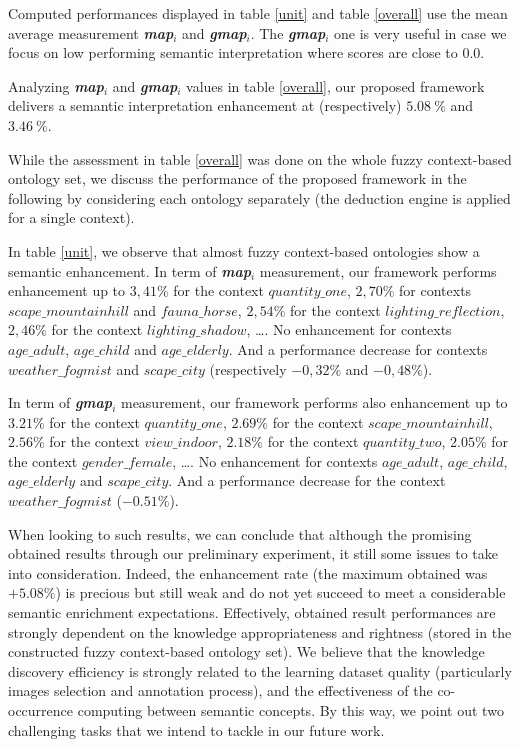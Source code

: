 Computed performances displayed in table \ref{unit} and table \ref{overall} use the mean average measurement \textbf{\textit{map$_{i}$}} and \textbf{\textit{gmap$_{i}$}}.  The \textbf{\textit{gmap$_{i}$}} one is very useful in case we focus on low performing semantic interpretation where scores are close to $0.0$. 

Analyzing \textbf{\textit{map$_{i}$}} and \textbf{\textit{gmap$_{i}$}} values in table \ref{overall}, our proposed framework delivers a semantic interpretation enhancement at (respectively) $5.08~\%$ and $3.46~\%$.

While the assessment in table \ref{overall} was done on the whole fuzzy context-based ontology set, we discuss the performance of the proposed framework in the following by considering each ontology separately (the deduction engine is applied for a single context).

In table \ref{unit}, we observe that almost fuzzy context-based ontologies show a semantic enhancement. In term of \textbf{\textit{map$_{i}$}} measurement, our framework performs enhancement up to $3,41\%$ for the context $quantity\_one$, $2,70\%$ for contexts $scape\_mountainhill$ and $fauna\_horse$, $2,54 \%$ for the context $lighting\_reflection$, $2,46 \%$ for the context $lighting\_shadow$, \dots. No enhancement for  contexts $age\_adult$, $age\_child$ and $age\_elderly$. And a performance decrease for contexts  $weather\_fogmist$ and $scape\_city$ (respectively $-0,32 \%$ and $-0,48\%$).

In term of \textbf{\textit{gmap$_{i}$}} measurement, our framework performs also enhancement up to $3.21\%$ for the context $quantity\_one$, $2.69\%$ for the context $scape\_mountainhill$, $2.56\%$ for the context $view\_indoor$, $2.18 \%$ for the context $quantity\_two$, $2.05\%$ for the context $gender\_female$, \dots. No enhancement for  contexts $age\_adult$, $age\_child$, $age\_elderly$ and $scape\_city$. And a performance decrease for the context  $weather\_fogmist$ ($-0.51 \%$).

When looking to such results, we can conclude that although the promising obtained results through our preliminary experiment, it still some issues to take into consideration. Indeed, the enhancement rate (the maximum obtained was $+5.08\%$) is precious but still weak and do not yet succeed to meet a considerable semantic enrichment expectations. Effectively, obtained result performances are strongly dependent on the knowledge appropriateness and rightness (stored in the constructed fuzzy context-based ontology set). We believe that the knowledge discovery efficiency is strongly related to the learning dataset
 quality (particularly images selection and annotation process), and the effectiveness of the co-occurrence computing between semantic concepts. By this way, we point out two challenging tasks that we intend to tackle in our future work.

